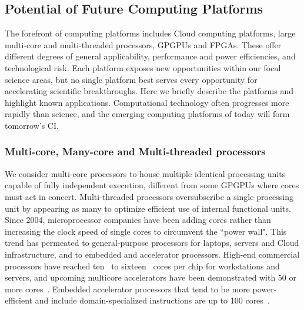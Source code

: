 \subsection{Potential of Future Computing Platforms}
The forefront of computing platforms includes Cloud computing platforms, large multi-core and
multi-threaded processors, GPGPUs and FPGAs. These offer different degrees of general applicability,
performance and power efficiencies, and technological risk. 
Each platform exposes new
opportunities within our focal science areas, but no single platform best serves every opportunity
for accelerating scientific breakthroughs. 
Here we briefly describe the platforms and highlight
known applications. Computational technology often progresses more rapidly than science, and the
emerging computing platforms of today will form tomorrow's CI.

\subsubsection{Multi-core, Many-core and Multi-threaded processors}
We consider multi-core processors to house multiple identical processing units capable of fully
independent execution, different from some GPGPUs where cores must act in concert. 
Multi-threaded processors oversubscribe a single processing unit by appearing as many to optimize
efficient use of internal functional units. 
Since 2004, microprocessor companies have been adding
cores rather than increasing the clock speed of single cores to circumvent the ``power wall".
This
trend has permeated to general-purpose processors for laptops, servers and Cloud infrastructure, and
to embedded and accelerator processors. 
High-end commercial processors have reached ten~\cite{conf/isscc/SawantDSSRADN11} to
sixteen~\cite{Butler:2011:BAM,conf/isscc/ShinTHPPHLSJSGLS10} cores per chip for workstations and servers, and upcoming multicore accelerators
have been demonstrated with 50 or more cores~\cite{intel.mic}. 
Embedded accelerator processors that tend to
be more power-efficient and include domain-specialized instructions are up to 100 cores~\cite{Bell2008, TileGX8100}.

